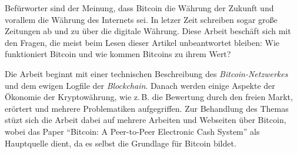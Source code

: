Befürworter sind der Meinung, dass Bitcoin die Währung der Zukunft und vorallem die Währung des Internets sei.
In letzer Zeit schreiben sogar große Zeitungen ab und zu über die digitale Währung.
Diese Arbeit beschäft sich mit den Fragen, die meist beim Lesen dieser Artikel unbeantwortet bleiben:
Wie funktioniert Bitcoin und wie kommen Bitcoins zu ihrem Wert?

Die Arbeit beginnt mit einer technischen Beschreibung des \emph{Bitcoin-Netzwerkes} und dem ewigen Logfile der \emph{Blockchain}.
Danach werden einige Aspekte der Ökonomie der Kryptowährung, wie z.\,B. die Bewertung durch den freien Markt, erörtert und mehrere Problematiken aufgegriffen.
Zur Behandlung des Themas stüzt sich die Arbeit dabei auf mehrere Arbeiten und Webseiten über Bitcoin, wobei das Paper "`Bitcoin: A Peer-to-Peer Electronic Cash System"' als Hauptquelle dient, da es selbst die Grundlage für Bitcoin bildet.
